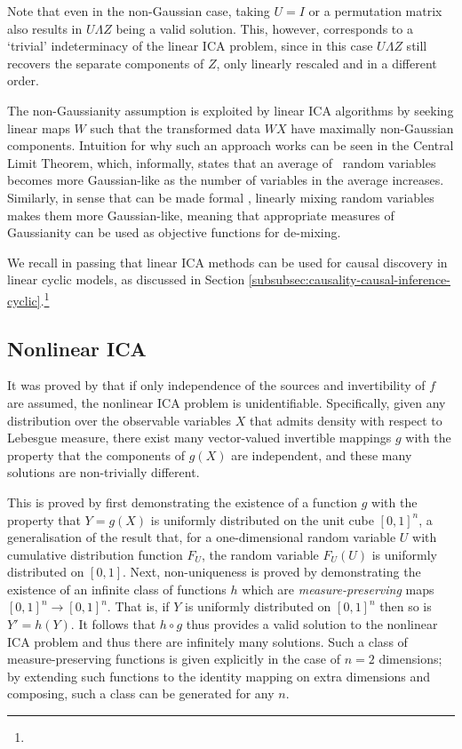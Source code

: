 Note that even in the non-Gaussian case, taking $U=I$ or a permutation matrix also results in $U\Lambda Z$ being a valid solution. 
This, however, corresponds to a `trivial' indeterminacy of the linear ICA problem, since in this case $U\Lambda Z$ still recovers the separate components of $Z$, only linearly rescaled and in a different order.

The non-Gaussianity assumption is exploited by linear ICA algorithms by seeking linear maps $W$ such that the transformed data ${W}X$ have maximally non-Gaussian components.
Intuition for why such an approach works can be seen in the Central Limit Theorem, which, informally, states that an average of \iid~random variables becomes more Gaussian-like as the number of variables in the average increases. 
Similarly, in sense that can be made formal \citep{hyvarinen2000independent}, linearly mixing random variables makes them more Gaussian-like, meaning that appropriate measures of Gaussianity can be used as objective functions for de-mixing.

We recall in passing that linear ICA methods can be used for causal discovery in linear cyclic models, as discussed in Section \ref{subsubsec:causality-causal-inference-cyclic}.\footnote{}





\subsection{Nonlinear ICA}\label{subsec:ica-literature-nonlinear-ica}
 
It was proved by \cite{hyvarinen1999nonlinear} that if only independence of the sources and invertibility of $f$ are assumed, the nonlinear ICA problem is unidentifiable.
Specifically, given any distribution over the observable variables $X$ that admits density with respect to Lebesgue measure, there exist many vector-valued invertible mappings $g$ with the property that the components of $g(X)$ are independent, and these many solutions are non-trivially different.

This is proved by first demonstrating the existence of a function $g$ with the property that $Y=g(X)$ is uniformly distributed on the unit cube $[0, 1]^n$,
a generalisation of the result that, for a one-dimensional random variable $U$  with cumulative distribution function $F_U$, the random variable $F_U(U)$ is uniformly distributed on $[0,1]$.
Next, non-uniqueness is proved by demonstrating the existence of an infinite class of functions $h$ which are \emph{measure-preserving} maps $[0,1]^n \to [0,1]^n$. 
That is, if $Y$ is uniformly distributed on $[0,1]^n$ then so is  $Y' = {h}({Y})$.
It follows that ${h}\circ {g}$ thus provides a valid solution to the nonlinear ICA problem and thus there are infinitely many solutions. 
Such a class of measure-preserving functions is given explicitly in the case of $n=2$ dimensions; by extending such functions to the identity mapping on extra dimensions and composing, such a class can be generated for any $n$.

